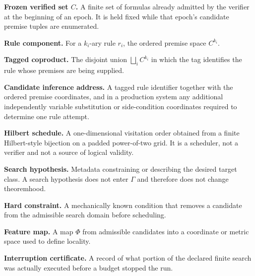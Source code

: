 \documentclass[11pt]{article}
\theoremstyle{hilberttheorem}
\begin{document}
\textbf{Frozen verified set $C$.} A finite set of formulas already admitted by the verifier at the beginning of an epoch. It is held fixed while that epoch's candidate premise tuples are enumerated.

\textbf{Rule component.} For a $k_i$-ary rule $r_i$, the ordered premise space $C^{k_i}$.

\textbf{Tagged coproduct.} The disjoint union $\bigsqcup_i C^{k_i}$ in which the tag identifies the rule whose premises are being supplied.

\textbf{Candidate inference address.} A tagged rule identifier together with the ordered premise coordinates, and in a production system any additional independently variable substitution or side-condition coordinates required to determine one rule attempt.

\textbf{Hilbert schedule.} A one-dimensional visitation order obtained from a finite Hilbert-style bijection on a padded power-of-two grid. It is a scheduler, not a verifier and not a source of logical validity.

\textbf{Search hypothesis.} Metadata constraining or describing the desired target class. A search hypothesis does not enter $\Gamma$ and therefore does not change theoremhood.

\textbf{Hard constraint.} A mechanically known condition that removes a candidate from the admissible search domain before scheduling.

\textbf{Feature map.} A map $\Phi$ from admissible candidates into a coordinate or metric space used to define locality.

\textbf{Interruption certificate.} A record of what portion of the declared finite search was actually executed before a budget stopped the run.
\end{document}
